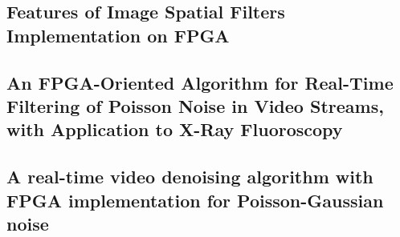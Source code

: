 \subsection{Features of Image Spatial Filters Implementation on FPGA}

\subsection{An FPGA-Oriented Algorithm for Real-Time Filtering of Poisson Noise in Video Streams, with Application to X-Ray Fluoroscopy}

\subsection{A real-time video denoising algorithm with FPGA implementation for Poisson-Gaussian noise}
